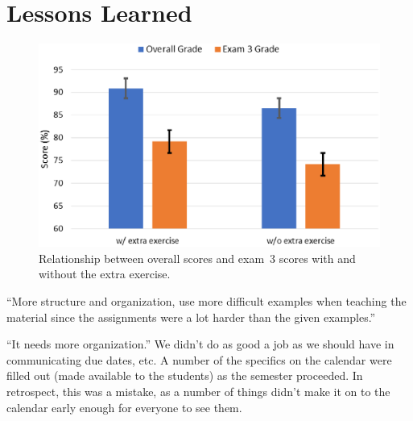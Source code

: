 \section{Lessons Learned}
\label{sec:lessons}




\begin{figure}[ht]
\centering
\includegraphics[width=\columnwidth]{scores}
\caption{Relationship between overall scores and exam~3 scores
with and without the extra exercise.}
\label{fig:scores}
\end{figure}

``More structure and organization, use more difficult examples when
teaching the material since the assignments were a lot harder than
the given examples.''

``It needs more organization.'' We didn't do as good a job as we should have
in communicating due dates, etc. A number of the specifics on the calendar
were filled out (made available to the students) as the semester proceeded.
In retrospect, this was a mistake, as a number of things didn't make it on
to the calendar early enough for everyone to see them.
